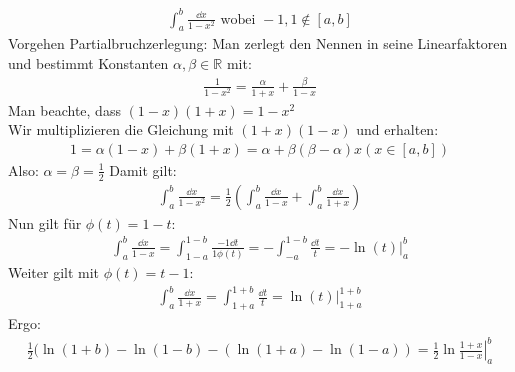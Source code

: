 \begin{Beispiel}
	\begin{align*}
		\int_a^b \frac{\dd{x}}{1-x^2} \text{ wobei } -1, 1 \notin [a,b]
	\end{align*}
	Vorgehen Partialbruchzerlegung: Man zerlegt den Nennen in seine Linearfaktoren 
	und bestimmt Konstanten $\alpha, \beta \in \mathbb{R}$ mit:
	\begin{align*}
		\frac{1}{1-x^2} = \frac{\alpha}{1+x} + \frac{\beta}{1-x}
	\end{align*}
	Man beachte, dass $(1-x)(1+x) = 1 -x^2$ \\
	Wir multiplizieren die Gleichung mit $(1+x)(1-x)$ und erhalten: 
	\begin{align*}
		1 = \alpha (1 -x) + \beta (1+x) 
		= \alpha + \beta (\beta-\alpha)x (x \in [a,b])
	\end{align*}
	Also: $ \alpha = \beta = \frac{1}{2}$
	Damit gilt:
	\begin{align*}
		\int_a^b \frac{\dd{x}}{1-x^2} = \frac{1}{2} \left( \int_a^b \frac{\dd{x}}{1-x} + \int_a^b \frac{\dd{x}}{1+x} \right)
	\end{align*}
	Nun gilt für $\phi(t) = 1 - t$:
	\begin{align*}
		\int_a^b \frac{\dd{x}}{1-x} = \int_{1-a}^{1-b} \frac{-1 \dd{t}}{1 \phi(t)}
		= - \int_{-a}^{1-b} \frac{\dd{t}}{t} = \left. -\ln(t)\right\vert_a^b
	\end{align*}
	Weiter gilt mit $\phi(t) = t-1$:
	\begin{align*}
		\int_a^b \frac{\dd{x}}{1+x} = \int_{1+a}^{1+b} \frac{\dd{t}}{t} = \left.\ln 
		(t) \right\vert_{1+a}^{1+b}
	\end{align*}
	Ergo:
	\begin{align*}
		\frac{1}{2}(\ln(1+b) - \ln(1-b) - (\ln(1+a) - \ln(1-a))
		= \left. \frac{1}{2} \ln \frac{1+x}{1-x}\right\vert_a^b
	\end{align*}	
\end{Beispiel}

